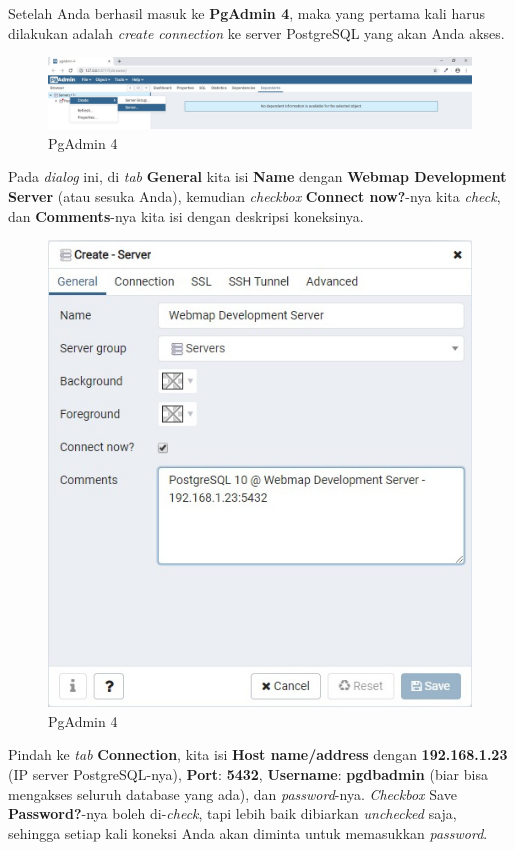 \documentclass[]{book}
\begin{document}
Setelah Anda berhasil masuk ke \textbf{PgAdmin 4}, maka yang pertama kali harus dilakukan adalah \emph{create connection} ke server PostgreSQL yang akan Anda akses.

\begin{figure}
\centering
\includegraphics{./img/pgadmin4-create.jpg}
\caption{PgAdmin 4}
\end{figure}

Pada \emph{dialog} ini, di \emph{tab} \textbf{General} kita isi \textbf{Name} dengan \textbf{Webmap Development Server} (atau sesuka Anda), kemudian \emph{checkbox} \textbf{Connect now?}-nya kita \emph{check}, dan \textbf{Comments}-nya kita isi dengan deskripsi koneksinya.

\begin{figure}
\centering
\includegraphics{./img/pgadmin4-create-general.jpg}
\caption{PgAdmin 4}
\end{figure}

Pindah ke \emph{tab} \textbf{Connection}, kita isi \textbf{Host name/address} dengan \textbf{192.168.1.23} (IP server PostgreSQL-nya), \textbf{Port}: \textbf{5432}, \textbf{Username}: \textbf{pgdbadmin} (biar bisa mengakses seluruh database yang ada), dan \emph{password}-nya. \emph{Checkbox} Save \textbf{Password?}-nya boleh di-\emph{check}, tapi lebih baik dibiarkan \emph{unchecked} saja, sehingga setiap kali koneksi Anda akan diminta untuk memasukkan \emph{password}.
\end{document}
